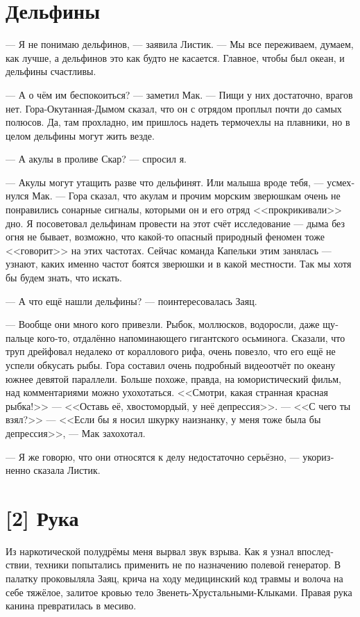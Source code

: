 \documentclass[a4paper,12pt,fleqn]{book}\usepackage{polyglossia}\setdefaultlanguage[babelshorthands=true]{russian}\setotherlanguage{english}\defaultfontfeatures{Ligatures=TeX,Mapping=tex-text}\usepackage{xcolor}\newcommand{\ml}[3]{#2}
\begin{document}
{\section{Дельфины}

--- Я не понимаю дельфинов, --- заявила Листик.
--- Мы все переживаем, думаем, как лучше, а дельфинов это как будто не касается.
Главное, чтобы был океан, и дельфины счастливы.

--- А о чём им беспокоиться? --- заметил Мак.
--- Пищи у них достаточно, врагов нет.
Гора-Окутанная-Дымом сказал, что он с отрядом проплыл почти до самых полюсов.
Да, там прохладно, им пришлось надеть термочехлы на плавники, но в целом дельфины могут жить везде.

--- А акулы в проливе Скар? --- спросил я.

--- Акулы могут утащить разве что дельфинят.
Или малыша вроде тебя, --- усмехнулся Мак.
--- Гора сказал, что акулам и прочим морским зверюшкам очень не понравились сонарные сигналы, которыми он и его отряд <<прокрикивали>> дно.
Я посоветовал дельфинам провести на этот счёт исследование --- дыма без огня не бывает, возможно, что какой-то опасный природный феномен тоже <<говорит>> на этих частотах.
Сейчас команда Капельки этим занялась --- узнают, каких именно частот боятся зверюшки и в какой местности.
Так мы хотя бы будем знать, что искать.

--- А что ещё нашли дельфины? --- поинтересовалась Заяц.

--- Вообще они много кого привезли.
Рыбок, моллюсков, водоросли, даже щупальце кого-то, отдалённо напоминающего гигантского осьминога.
Сказали, что труп дрейфовал недалеко от кораллового рифа, очень повезло, что его ещё не успели обкусать рыбы.
Гора составил очень подробный видеоотчёт по океану южнее девятой параллели.
Больше похоже, правда, на юмористический фильм, над комментариями можно ухохотаться.
<<Смотри, какая странная красная рыбка!>>
--- <<Оставь её, хвостомордый, у неё депрессия>>.
--- <<С чего ты взял?>>
--- <<Если бы я носил шкурку наизнанку, у меня тоже была бы депрессия>>, --- Мак захохотал.

--- Я же говорю, что они относятся к делу недостаточно серьёзно, --- укоризненно сказала Листик.

\section{[2] Рука}

Из наркотической полудрёмы меня вырвал звук взрыва.
Как я узнал впоследствии, техники попытались применить не по назначению полевой генератор.
В палатку проковыляла Заяц, крича на ходу медицинский код травмы и волоча на себе тяжёлое, залитое кровью тело Звенеть-Хрустальными-Клыками.
Правая рука канина превратилась в месиво.

}
\end{document}

